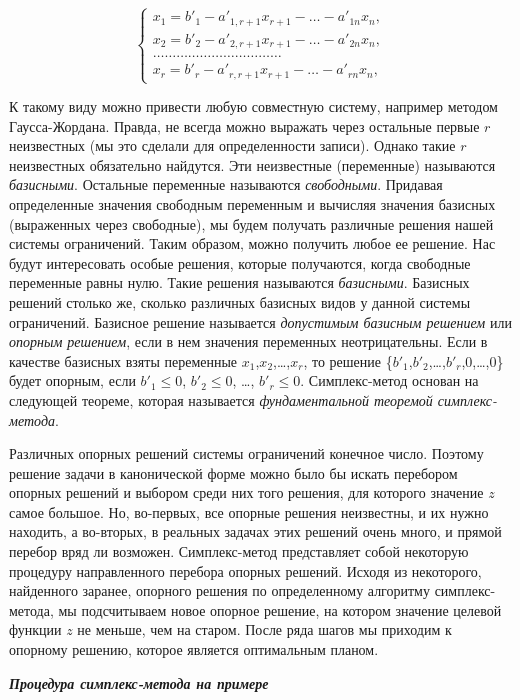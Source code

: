 \begin{equation*}
\begin{cases}
x_1 = b'_1 - a'_{1,r+1}x_{r+1} - \dots - a'_{1n}x_n,\\
x_2 = b'_2 - a'_{2,r+1}x_{r+1} - \dots - a'_{2n}x_n,\\
\dots\dots\dots\dots\dots\dots\dots\dots\dots\dots\dots\\
x_r = b'_r - a'_{r,r+1}x_{r+1} - \dots - a'_{rn}x_n,
\end{cases}
\end{equation*}

К такому виду можно привести любую совместную систему, например методом Гаусса-Жордана. Правда, не всегда можно выражать через остальные первые $r$ неизвестных (мы это сделали для определенности записи). Однако такие $r$ неизвестных обязательно найдутся. Эти неизвестные (переменные) называются \textit{базисными}. Остальные переменные называются   \textit{свободными}. Придавая определенные значения свободным переменным и вычисляя значения базисных (выраженных через свободные), мы будем получать различные решения нашей системы ограничений. Таким образом, можно получить любое ее решение. Нас будут интересовать особые решения, которые  получаются, когда свободные переменные равны нулю. Такие решения  называются \textit{базисными}. Базисных решений столько же, сколько  различных  базисных видов у данной системы ограничений. Базисное решение называется \textit{допустимым базисным решением} или \textit{опорным решением}, если в нем значения переменных неотрицательны. Если в качестве базисных взяты переменные $x_1$,$x_2$,\dots,$x_r$, то решение \{$b'_1$,$b'_2$,\dots,$b'_r$,0,\dots,0\} будет опорным, если $b'_1 \leq 0$,    $b'_2 \leq 0$, \dots, $b'_r \leq 0$. Симплекс-метод основан на следующей теореме, которая называется \textit{фундаментальной теоремой симплекс-метода}.


Различных опорных решений системы ограничений конечное число. Поэтому решение задачи в канонической форме можно было бы искать  перебором опорных решений и выбором среди них того решения,  для  которого  значение $z$ самое большое. Но, во-первых, все опорные решения неизвестны, и их нужно находить, а во-вторых, в реальных задачах этих решений очень много, и прямой перебор вряд ли возможен. Симплекс-метод  представляет собой  некоторую  процедуру  направленного перебора опорных решений.  Исходя из некоторого, найденного заранее, опорного решения по определенному алгоритму симплекс-метода, мы подсчитываем новое опорное решение, на котором значение целевой функции $z$ не меньше, чем на старом. После ряда шагов мы приходим к опорному решению, которое является  оптимальным планом.
\begin{center}
\textit{\textbf{Процедура симплекс-метода на примере}}
\end{center}

